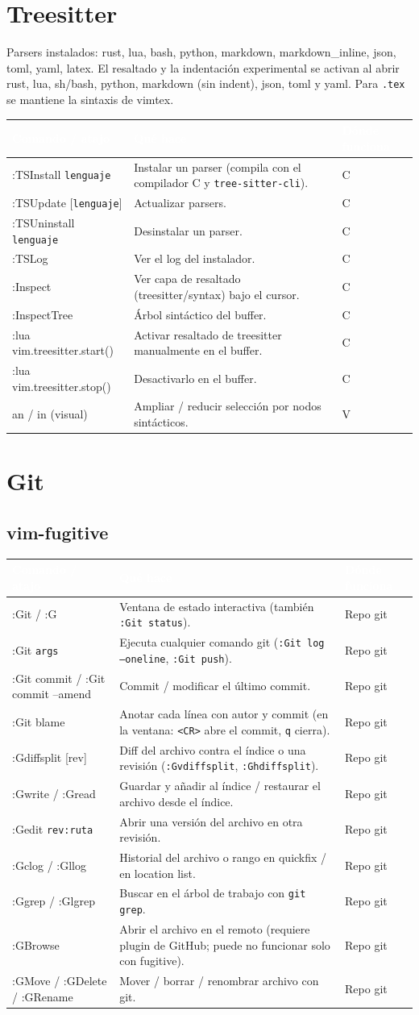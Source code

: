 \documentclass[8pt,a4paper,landscape]{extarticle}
\newcommand{\kk}[1]{\texttt{#1}}
\newenvironment{cht}{%
  \begin{longtable}{>{\raggedright\arraybackslash\ttfamily}p{0.27\textwidth}
                    >{\raggedright\arraybackslash}p{0.46\textwidth}
                    >{\raggedright\arraybackslash}p{0.21\textwidth}}
  \rowcolor{accent}\textcolor{white}{\textbf{\rmfamily Comando / atajo}} &
  \textcolor{white}{\textbf{Qué hace}} & \textcolor{white}{\textbf{Dónde funciona}} \\
  \endhead
}{\end{longtable}}
\newcommand{\rr}[3]{#1 & #2 & #3 \\}
\newcommand{\rg}[3]{\rowcolor{rowgray}\relax #1 & #2 & #3 \\}
\let\oldsubsection\subsection
\renewcommand{\subsection}{\Needspace{9\baselineskip}\oldsubsection}
\let\oldsection\section
\renewcommand{\section}{\Needspace{10\baselineskip}\oldsection}
\begin{document}
\section{Treesitter}
Parsers instalados: rust, lua, bash, python, markdown, markdown\_inline, json, toml, yaml, latex. El resaltado y la indentación experimental se activan al abrir rust, lua, sh/bash, python, markdown (sin indent), json, toml y yaml. Para \kk{.tex} se mantiene la sintaxis de vimtex.
\begin{cht}
\rg{:TSInstall \kk{lenguaje}}{Instalar un parser (compila con el compilador C y \kk{tree-sitter-cli}).}{C}
\rr{:TSUpdate [\kk{lenguaje}]}{Actualizar parsers.}{C}
\rg{:TSUninstall \kk{lenguaje}}{Desinstalar un parser.}{C}
\rr{:TSLog}{Ver el log del instalador.}{C}
\rg{:Inspect}{Ver capa de resaltado (treesitter/syntax) bajo el cursor.}{C}
\rr{:InspectTree}{Árbol sintáctico del buffer.}{C}
\rg{:lua vim.treesitter.start()}{Activar resaltado de treesitter manualmente en el buffer.}{C}
\rr{:lua vim.treesitter.stop()}{Desactivarlo en el buffer.}{C}
\rg{an / in (visual)}{Ampliar / reducir selección por nodos sintácticos.}{V}
\end{cht}

\section{Git}

\subsection{vim-fugitive}
\begin{cht}
\rg{:Git / :G}{Ventana de estado interactiva (también \kk{:Git status}).}{Repo git}
\rr{:Git \kk{args}}{Ejecuta cualquier comando git (\kk{:Git log --oneline}, \kk{:Git push}).}{Repo git}
\rg{:Git commit / :Git commit --amend}{Commit / modificar el último commit.}{Repo git}
\rr{:Git blame}{Anotar cada línea con autor y commit (en la ventana: \kk{<CR>} abre el commit, \kk{q} cierra).}{Repo git}
\rg{:Gdiffsplit [rev]}{Diff del archivo contra el índice o una revisión (\kk{:Gvdiffsplit}, \kk{:Ghdiffsplit}).}{Repo git}
\rr{:Gwrite / :Gread}{Guardar y añadir al índice / restaurar el archivo desde el índice.}{Repo git}
\rg{:Gedit \kk{rev:ruta}}{Abrir una versión del archivo en otra revisión.}{Repo git}
\rr{:Gclog / :Gllog}{Historial del archivo o rango en quickfix / en location list.}{Repo git}
\rg{:Ggrep / :Glgrep}{Buscar en el árbol de trabajo con \kk{git grep}.}{Repo git}
\rr{:GBrowse}{Abrir el archivo en el remoto (requiere plugin de GitHub; puede no funcionar solo con fugitive).}{Repo git}
\rg{:GMove / :GDelete / :GRename}{Mover / borrar / renombrar archivo con git.}{Repo git}
\end{cht}
\end{document}
